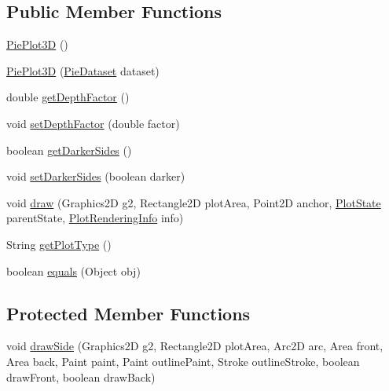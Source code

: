 \subsection*{Public Member Functions}
\begin{DoxyCompactItemize}
\item 
\mbox{\hyperlink{classorg_1_1jfree_1_1chart_1_1plot_1_1_pie_plot3_d_aa7e41b53624e2b5a4f778b30ba8f5bcd}{Pie\+Plot3D}} ()
\item 
\mbox{\hyperlink{classorg_1_1jfree_1_1chart_1_1plot_1_1_pie_plot3_d_a1654d06e2203edc768388b1b5e36654b}{Pie\+Plot3D}} (\mbox{\hyperlink{interfaceorg_1_1jfree_1_1data_1_1general_1_1_pie_dataset}{Pie\+Dataset}} dataset)
\item 
double \mbox{\hyperlink{classorg_1_1jfree_1_1chart_1_1plot_1_1_pie_plot3_d_a10ffdfa0adfbe06f4344390b3e9596c5}{get\+Depth\+Factor}} ()
\item 
void \mbox{\hyperlink{classorg_1_1jfree_1_1chart_1_1plot_1_1_pie_plot3_d_a8b4759289ed982cd7d456b44b90f6b13}{set\+Depth\+Factor}} (double factor)
\item 
boolean \mbox{\hyperlink{classorg_1_1jfree_1_1chart_1_1plot_1_1_pie_plot3_d_a3a06898f05f1e6737aa01f781d80a50e}{get\+Darker\+Sides}} ()
\item 
void \mbox{\hyperlink{classorg_1_1jfree_1_1chart_1_1plot_1_1_pie_plot3_d_ad880cf39b21e7aee0c5a6f0d97859e4a}{set\+Darker\+Sides}} (boolean darker)
\item 
void \mbox{\hyperlink{classorg_1_1jfree_1_1chart_1_1plot_1_1_pie_plot3_d_aec0a97c54aa5b9e3920d0180bdd5a49f}{draw}} (Graphics2D g2, Rectangle2D plot\+Area, Point2D anchor, \mbox{\hyperlink{classorg_1_1jfree_1_1chart_1_1plot_1_1_plot_state}{Plot\+State}} parent\+State, \mbox{\hyperlink{classorg_1_1jfree_1_1chart_1_1plot_1_1_plot_rendering_info}{Plot\+Rendering\+Info}} info)
\item 
String \mbox{\hyperlink{classorg_1_1jfree_1_1chart_1_1plot_1_1_pie_plot3_d_a938e095a670a32c462f0b626704b32fe}{get\+Plot\+Type}} ()
\item 
boolean \mbox{\hyperlink{classorg_1_1jfree_1_1chart_1_1plot_1_1_pie_plot3_d_a5ef3e497d70689a188d74a2781ebafc3}{equals}} (Object obj)
\end{DoxyCompactItemize}
\subsection*{Protected Member Functions}
\begin{DoxyCompactItemize}
\item 
void \mbox{\hyperlink{classorg_1_1jfree_1_1chart_1_1plot_1_1_pie_plot3_d_a350945adfe903b739c352993fa186c73}{draw\+Side}} (Graphics2D g2, Rectangle2D plot\+Area, Arc2D arc, Area front, Area back, Paint paint, Paint outline\+Paint, Stroke outline\+Stroke, boolean draw\+Front, boolean draw\+Back)
\end{DoxyCompactItemize}
